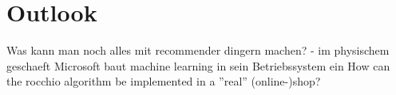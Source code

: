 

\section{Outlook}

Was kann man noch alles mit recommender dingern machen?
- im physischem geschaeft
Microsoft baut machine learning in sein Betriebssystem ein
How can the rocchio algorithm be implemented in a ”real” (online-)shop?
